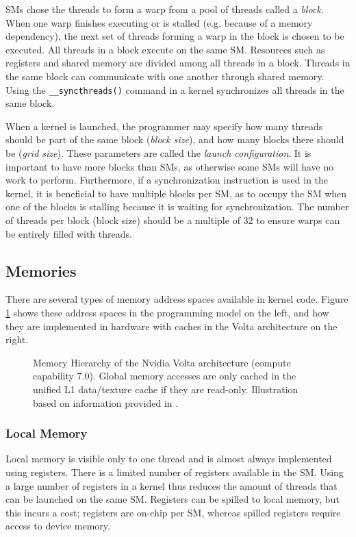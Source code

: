 SMs chose the threads to form a warp from a pool of threads called a \emph{block}. When one warp finishes executing or is stalled (e.g. because of a memory dependency), the next set of threads forming a warp in the block is chosen to be executed. All threads in a block execute on the same SM. Resources such as registers and shared memory are divided among all threads in a block. Threads in the same block can communicate with one another through shared memory. Using the \texttt{\_\_syncthreads()} command in a kernel synchronizes all threads in the same block.

When a kernel is launched, the programmer may specify how many threads should be part of the same block (\emph{block size}), and how many blocks there should be (\emph{grid size}). These parameters are called the \emph{launch configuration}. It is important to have more blocks than SMs, as otherwise some SMs will have no work to perform. Furthermore, if a synchronization instruction is used in the kernel, it is beneficial to have multiple blocks per SM, as to occupy the SM when one of the blocks is stalling because it is waiting for synchronization. The number of threads per block (block size) should be a multiple of 32 to ensure warps can be entirely filled with threads. \cite[Section~10]{cuda-best-practices}

\subsection{Memories} \label{sec:memories}

There are several types of memory address spaces available in kernel code. Figure \ref{fig:memory-hierarchy} shows these address spaces in the programming model on the left, and how they are implemented in hardware with caches in the Volta architecture on the right. 

\begin{figure}
	\makebox[\textwidth]{
	}
	\caption{\label{fig:memory-hierarchy} Memory Hierarchy of the Nvidia Volta architecture (compute capability 7.0). Global memory accesses are only cached in the unified L1 data/texture cache if they are read-only. Illustration based on information provided in \cite[Sections 2.3, 5.3.2, H.6]{cuda-programming}.}
\end{figure}

\subsubsection{Local Memory}
Local memory is visible only to one thread and is almost always implemented using registers. There is a limited number of registers available in the SM. Using a large number of registers in a kernel thus reduces the amount of threads that can be launched on the same SM. Registers can be spilled to local memory, but this incurs a cost; registers are on-chip per SM, whereas spilled registers require access to device memory.

